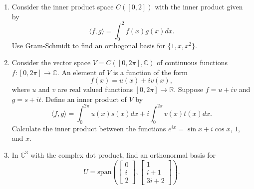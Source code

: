 \documentclass[a4paper,11pt]{article}
\theoremstyle{definition}
\begin{document}
\begin{enumerate}[(1)]
    \item 
    Consider the inner product space $C([0,2])$ with the inner product given by 
    \[
    \langle f,g\rangle = \int_0^2f(x)g(x)dx.
    \]
    Use Gram-Schmidt  to find an orthogonal basis for $\{1,x,x^2\}$.

    \item 
    Consider the vector space $V=C([0,2\pi],\mathbb C)$ of continuous functions $f:[0,2\pi]\to\mathbb C$.
    An element of $V$ is a function of the form \[f(x) = u(x)+iv(x),\] where $u$ and $v$ are real valued functions $[0,2\pi]\to \mathbb R$.
    Suppose $f=u+iv$ and $g=s+it$.
    Define an inner product of $V$ by
    \[
    \langle f,g\rangle
    =\int_0^{2\pi} u(x)s(x)dx+i\int_0^{2\pi}v(x)t(x)dx.
    \]
    Calculate the inner product between the functions $e^{ix}=\sin x+i\cos x$, $1$, and $x$.
    \item 
    In $\mathbb C^3$ with the complex dot product, find an orthonormal basis for
    \[
    U = \text{span}\left(\begin{bmatrix}
        0\\i\\2
    \end{bmatrix},\begin{bmatrix}
        1\\i+1\\3i+2
    \end{bmatrix}\right).
    \]
    
    
\end{enumerate}
\end{document}
